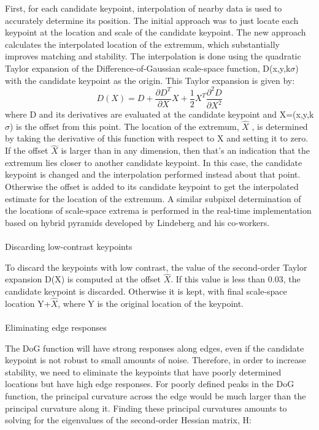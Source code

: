 \documentclass[12pt]{article}
\begin{document}
\begin{itemize}
	First, for each candidate keypoint, interpolation of nearby data is used to accurately determine its position. The initial approach was to just locate each keypoint at the location and scale of the candidate keypoint. The new approach calculates the interpolated location of the extremum, which substantially improves matching and stability. The interpolation is done using the quadratic Taylor expansion of the Difference-of-Gaussian scale-space function, D(x,y,k$\sigma$) with the candidate keypoint as the origin. This Taylor expansion is given by:
\begin{equation}
D(X)=D+\frac{\partial D^T}{\partial X}X+\frac{1}{2}X^T \frac{\partial^2 D}{\partial X^2}
\end{equation}
where D and its derivatives are evaluated at the candidate keypoint and  X=(x,y,k$\sigma$) is the offset from this point. The location of the extremum, $\hat{X}$ , is determined by taking the derivative of this function with respect to X and setting it to zero. If the offset $\hat{X}$ is larger than   in any dimension, then that's an indication that the extremum lies closer to another candidate keypoint. In this case, the candidate keypoint is changed and the interpolation performed instead about that point. Otherwise the offset is added to its candidate keypoint to get the interpolated estimate for the location of the extremum. A similar subpixel determination of the locations of scale-space extrema is performed in the real-time implementation based on hybrid pyramids developed by Lindeberg and his co-workers.
 	\paragraph{}
	\subitem Discarding low-contrast keypoints
	
	To discard the keypoints with low contrast, the value of the second-order Taylor expansion D(X) is computed at the offset $\hat{X}$. If this value is less than 0.03, the candidate keypoint is discarded. Otherwise it is kept, with final scale-space location Y+$\hat{X}$, where Y is the original location of the keypoint.
	\paragraph{}
	\subitem Eliminating edge responses
	
	The DoG function will have strong responses along edges, even if the candidate keypoint is not robust to small amounts of noise. Therefore, in order to increase stability, we need to eliminate the keypoints that have poorly determined locations but have high edge responses.
For poorly defined peaks in the DoG function, the principal curvature across the edge would be much larger than the principal curvature along it. Finding these principal curvatures amounts to solving for the eigenvalues of the second-order Hessian matrix, H:



\end{itemize}
\end{document}
